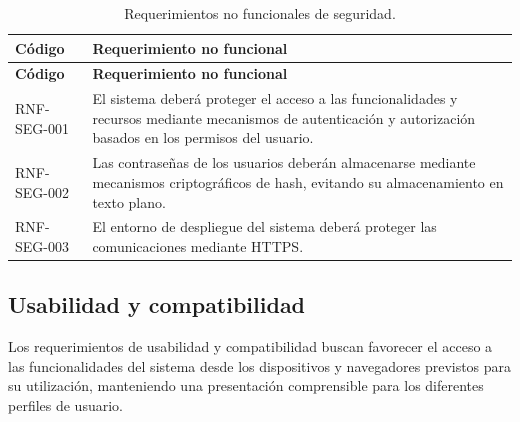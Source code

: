 \begin{longtable}{|p{}|p{}|}
    \caption{Requerimientos no funcionales de seguridad.}
    \label{tab:rnf-seguridad}\\
    \hline
    \textbf{Código} & \textbf{Requerimiento no funcional} \\
    \hline
    \endfirsthead

    \hline
    \textbf{Código} & \textbf{Requerimiento no funcional} \\
    \hline
    \endhead

    RNF-SEG-001 &
    El sistema deberá proteger el acceso a las funcionalidades y recursos
    mediante mecanismos de autenticación y autorización basados en los
    permisos del usuario. \\
    \hline

    RNF-SEG-002 &
    Las contraseñas de los usuarios deberán almacenarse mediante mecanismos
    criptográficos de hash, evitando su almacenamiento en texto plano. \\
    \hline

    RNF-SEG-003 &
    El entorno de despliegue del sistema deberá proteger las comunicaciones
    mediante HTTPS. \\
    \hline
\end{longtable}


\subsection{Usabilidad y compatibilidad}
\label{subsec:rnf-usabilidad}

Los requerimientos de usabilidad y compatibilidad buscan favorecer el acceso
a las funcionalidades del sistema desde los dispositivos y navegadores
previstos para su utilización, manteniendo una presentación comprensible para
los diferentes perfiles de usuario.

